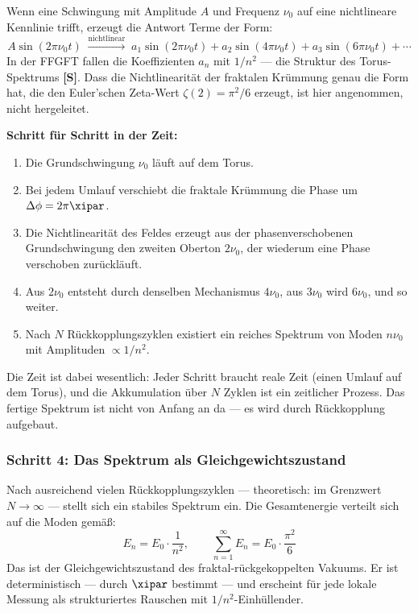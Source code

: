 Wenn eine Schwingung mit Amplitude $A$ und Frequenz $\nu_0$ auf eine
nichtlineare Kennlinie trifft, erzeugt die Antwort Terme der Form:
\begin{equation}
    A \sin(2\pi \nu_0 t) \;\xrightarrow{\text{nichtlinear}}\;
    a_1 \sin(2\pi \nu_0 t) + a_2 \sin(4\pi \nu_0 t) + a_3 \sin(6\pi \nu_0 t) + \cdots
\end{equation}
In der FFGFT fallen die Koeffizienten $a_n$ mit $1/n^2$ — die Struktur des
Torus-Spektrums \textbf{[S]}. Dass die Nichtlinearität der fraktalen Krümmung
genau die Form hat, die den Euler'schen Zeta-Wert $\zeta(2) = \pi^2/6$ erzeugt,
ist hier angenommen, nicht hergeleitet.

\begin{keypoint}
\textbf{Schritt für Schritt in der Zeit:}
\begin{enumerate}
    \item Die Grundschwingung $\nu_0$ läuft auf dem Torus.
    \item Bei jedem Umlauf verschiebt die fraktale Krümmung die Phase um $\Delta\phi = 2\pi\xipar$.
    \item Die Nichtlinearität des Feldes erzeugt aus der phasenverschobenen
    Grundschwingung den zweiten Oberton $2\nu_0$, der wiederum eine Phase
    verschoben zurückläuft.
    \item Aus $2\nu_0$ entsteht durch denselben Mechanismus $4\nu_0$, aus $3\nu_0$
    wird $6\nu_0$, und so weiter.
    \item Nach $N$ Rückkopplungszyklen existiert ein reiches Spektrum von Moden
    $n\nu_0$ mit Amplituden $\propto 1/n^2$.
\end{enumerate}
Die Zeit ist dabei wesentlich: Jeder Schritt braucht reale Zeit (einen Umlauf
auf dem Torus), und die Akkumulation über $N$ Zyklen ist ein zeitlicher Prozess.
Das fertige Spektrum ist nicht von Anfang an da — es wird durch Rückkopplung
aufgebaut.
\end{keypoint}

\subsubsection*{Schritt 4: Das Spektrum als Gleichgewichtszustand}

Nach ausreichend vielen Rückkopplungszyklen — theoretisch: im Grenzwert
$N \to \infty$ — stellt sich ein stabiles Spektrum ein. Die Gesamtenergie
verteilt sich auf die Moden gemäß:
\begin{equation}
    E_n = E_0 \cdot \frac{1}{n^2}, \qquad \sum_{n=1}^{\infty} E_n = E_0 \cdot \frac{\pi^2}{6}
\end{equation}
Das ist der Gleichgewichtszustand des fraktal-rückgekoppelten Vakuums. Er ist
deterministisch — durch $\xipar$ bestimmt — und erscheint für jede
lokale Messung als strukturiertes Rauschen mit $1/n^2$-Einhüllender.

